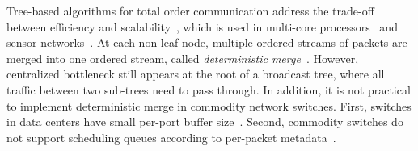 




Tree-based algorithms for total order communication address the trade-off between efficiency and scalability~\cite{rodrigues1998scalable}, which is used in multi-core processors~\cite{kaestle2016machine} and sensor networks~\cite{chakraborty2011reliable}.
At each non-leaf node, multiple ordered streams of packets are merged into one ordered stream, called \textit{deterministic merge}~\cite{hadzilacos1994modular, aguilera2000efficient}.
However, centralized bottleneck still appears at the root of a broadcast tree, where all traffic between two sub-trees need to pass through.
In addition, it is not practical to implement deterministic merge in commodity network switches.
First, switches in data centers have small per-port buffer size~\cite{bai2017congestion}.
Second, commodity switches do not support scheduling queues according to per-packet metadata~\cite{sivaraman2016programmable,jin2018netchain}.




